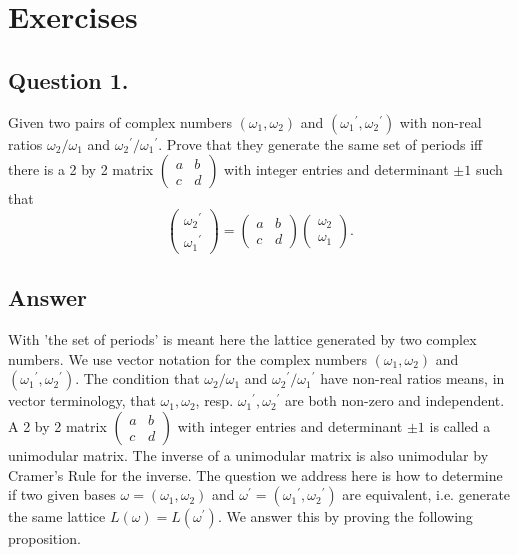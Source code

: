 \newpage
\section{Exercises}

\subsection{Question 1.}
\noindent
Given two pairs of complex numbers $(\omega_1, \omega_2)$ and $({\omega_1}^\prime, {\omega_2}^\prime)$ with non-real
ratios $\omega_2 / \omega_1$ and ${\omega_2}^\prime / {\omega_1}^\prime$. Prove that they generate the same set of
periods iff there is a 2 by 2 matrix $\begin{pmatrix} a & b \\ c & d \end{pmatrix}$ with integer entries and
determinant $\pm 1$ such that \[
\begin{pmatrix} {\omega_2}^\prime \\ {\omega_1}^\prime \end{pmatrix} =
\begin{pmatrix} a & b \\ c & d \end{pmatrix} \begin{pmatrix} \omega_2 \\ \omega_1 \end{pmatrix}.
\]

\subsection*{Answer}
\noindent
With 'the set of periods' is meant here the lattice generated by two complex numbers.
We use vector notation for the complex numbers $(\omega_1, \omega_2)$ and $({\omega_1}^\prime, {\omega_2}^\prime)$.
The condition that $\omega_2 / \omega_1$ and ${\omega_2}^\prime / {\omega_1}^\prime$ have non-real ratios means,
in vector terminology, that $\omega_1, \omega_2$, resp. ${\omega_1}^\prime, {\omega_2}^\prime$ are both
non-zero and independent.
A 2 by 2 matrix $\begin{pmatrix} a & b \\ c & d \end{pmatrix}$ with integer entries and determinant $\pm 1$ is called
a unimodular matrix. The inverse of a unimodular matrix is also unimodular by Cramer's Rule for the inverse.
The question we address here is how to determine if two given bases $\omega = (\omega_1, \omega_2)$ and
$\omega^\prime = ({\omega_1}^\prime, {\omega_2}^\prime)$ are equivalent, i.e. generate the same lattice
$L(\omega)=L(\omega^\prime)$.
We answer this by proving the following proposition.

